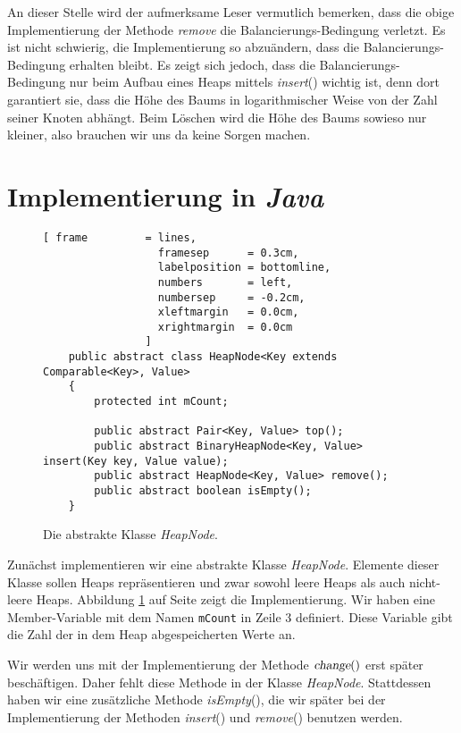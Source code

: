 An dieser Stelle wird der aufmerksame Leser vermutlich bemerken, dass die obige
Implementierung der Methode \textsl{remove} die Balancierungs-Bedingung verletzt.
Es ist nicht schwierig, die Implementierung so abzu\"andern, dass die
Balancierungs-Bedingung erhalten bleibt. Es zeigt sich jedoch, dass die
Balancierungs-Bedingung  nur beim Aufbau eines Heaps mittels \textsl{insert}() wichtig ist,
denn dort garantiert sie, dass die H\"ohe des Baums in logarithmischer Weise von der Zahl
seiner Knoten abh\"angt.  Beim L\"oschen wird die H\"ohe des Baums sowieso nur kleiner, also
brauchen wir uns da keine Sorgen machen.

\section{Implementierung in \textsl{Java}}

\begin{figure}[!h]
  \centering
\begin{Verbatim}[ frame         = lines, 
                  framesep      = 0.3cm, 
                  labelposition = bottomline,
                  numbers       = left,
                  numbersep     = -0.2cm,
                  xleftmargin   = 0.0cm,
                  xrightmargin  = 0.0cm
                ]
    public abstract class HeapNode<Key extends Comparable<Key>, Value>
    {
        protected int mCount;
    
        public abstract Pair<Key, Value> top();
        public abstract BinaryHeapNode<Key, Value> insert(Key key, Value value);
        public abstract HeapNode<Key, Value> remove();    
        public abstract boolean isEmpty();
    }
\end{Verbatim}
\vspace*{-0.3cm}
  \caption{Die abstrakte Klasse \textsl{HeapNode}.}
  \label{fig:HeapNode}
\end{figure}
Zun\"achst implementieren wir eine abstrakte Klasse \textsl{HeapNode}.  Elemente dieser
Klasse sollen Heaps repr\"asentieren und zwar sowohl leere Heaps als auch nicht-leere Heaps.
Abbildung \ref{fig:HeapNode} auf Seite \pageref{fig:HeapNode} zeigt die Implementierung.
Wir haben eine Member-Variable mit dem Namen \texttt{mCount} in Zeile 3 definiert.
Diese Variable gibt die Zahl der in dem Heap abgespeicherten Werte an.

Wir werden uns mit der Implementierung der Methode $\textsl{change}()$ erst sp\"ater
besch\"aftigen. Daher fehlt diese Methode in der Klasse \textsl{HeapNode}.
Stattdessen haben wir eine zus\"atzliche Methode \textsl{isEmpty}(), die wir sp\"ater bei der
Implementierung der Methoden \textsl{insert}() und \textsl{remove}() benutzen werden.

